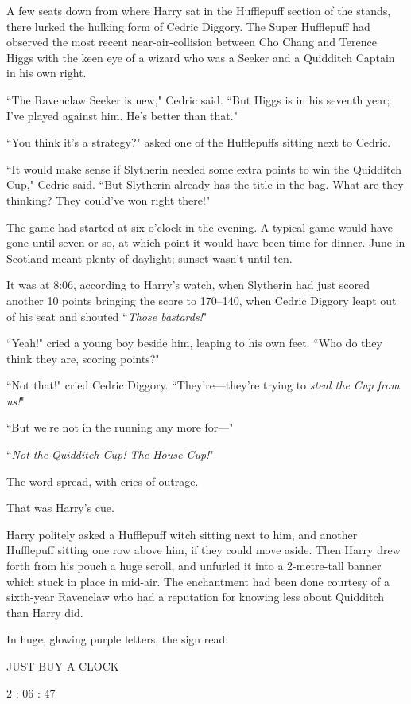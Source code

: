 A few seats down from where Harry sat in the Hufflepuff section of the stands, there lurked the hulking form of Cedric Diggory. The Super Hufflepuff had observed the most recent near-air-collision between Cho Chang and Terence Higgs with the keen eye of a wizard who was a Seeker and a Quidditch Captain in his own right.

``The Ravenclaw Seeker is new," Cedric said. ``But Higgs is in his seventh year; I've played against him. He's better than that."

``You think it's a strategy?" asked one of the Hufflepuffs sitting next to Cedric.

``It would make sense if Slytherin needed some extra points to win the Quidditch Cup," Cedric said. ``But Slytherin already has the title in the bag. What are they thinking? They could've won right there!"

The game had started at six o'clock in the evening. A typical game would have gone until seven or so, at which point it would have been time for dinner. June in Scotland meant plenty of daylight; sunset wasn't until ten.

It was at 8:06\pm, according to Harry's watch, when Slytherin had just scored another 10 points bringing the score to 170--{140}, when Cedric Diggory leapt out of his seat and shouted ``\emph{Those bastards!}"

``Yeah!" cried a young boy beside him, leaping to his own feet. ``Who do they think they are, scoring points?"

``Not that!" cried Cedric Diggory. ``They're—they're trying to \emph{steal the Cup from us!}"

``But we're not in the running any more for—"

``\emph{Not the Quidditch Cup! The House Cup!}"

The word spread, with cries of outrage.

That was Harry's cue.

Harry politely asked a Hufflepuff witch sitting next to him, and another Hufflepuff sitting one row above him, if they could move aside. Then Harry drew forth from his pouch a huge scroll, and unfurled it into a 2-metre-tall banner which stuck in place in mid-air. The enchantment had been done courtesy of a sixth-year Ravenclaw who had a reputation for knowing less about Quidditch than Harry did.

In huge, glowing purple letters, the sign read:

\begin{center}
JUST BUY A CLOCK

2 : 06 : 47
\end{center}

